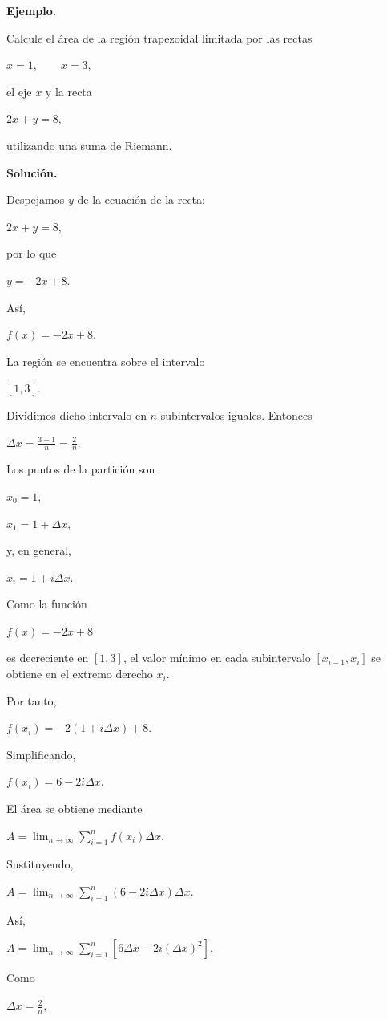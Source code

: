 \documentclass[12pt]{article}
\newenvironment{Ejem}
{\par\medskip\noindent\textbf{Ejemplo.}\ }
{\par\medskip}
\begin{document}
\begin{Ejem}

Calcule el área de la región trapezoidal limitada por las rectas

$
x=1,
\qquad
x=3,
$

el eje $x$ y la recta

$
2x+y=8,
$

utilizando una suma de Riemann.

\textbf{Solución.}

Despejamos $y$ de la ecuación de la recta:

$
2x+y=8,
$

por lo que

$
y=-2x+8.
$

Así,

$
f(x)=-2x+8.
$

La región se encuentra sobre el intervalo

$
[1,3].
$

Dividimos dicho intervalo en $n$ subintervalos iguales. Entonces

$
\Delta x
=
\frac{3-1}{n}
=
\frac{2}{n}.
$

Los puntos de la partición son

$
x_0=1,
$

$
x_1=1+\Delta x,
$

y, en general,

$
x_i=1+i\Delta x.
$

Como la función

$
f(x)=-2x+8
$

es decreciente en $[1,3]$, el valor mínimo en cada subintervalo
$[x_{i-1},x_i]$ se obtiene en el extremo derecho $x_i$.

Por tanto,

$
f(x_i)
=
-2(1+i\Delta x)+8.
$

Simplificando,

$
f(x_i)
=
6-2i\Delta x.
$

El área se obtiene mediante

$
A
=
\lim_{n\to\infty}
\sum_{i=1}^{n}
f(x_i)\Delta x.
$

Sustituyendo,

$
A
=
\lim_{n\to\infty}
\sum_{i=1}^{n}
\left(
6-2i\Delta x
\right)\Delta x.
$

Así,

$
A
=
\lim_{n\to\infty}
\sum_{i=1}^{n}
\left[
6\Delta x
-
2i(\Delta x)^2
\right].
$

Como

$
\Delta x=\frac{2}{n},
$


\end{Ejem}
\end{document}
